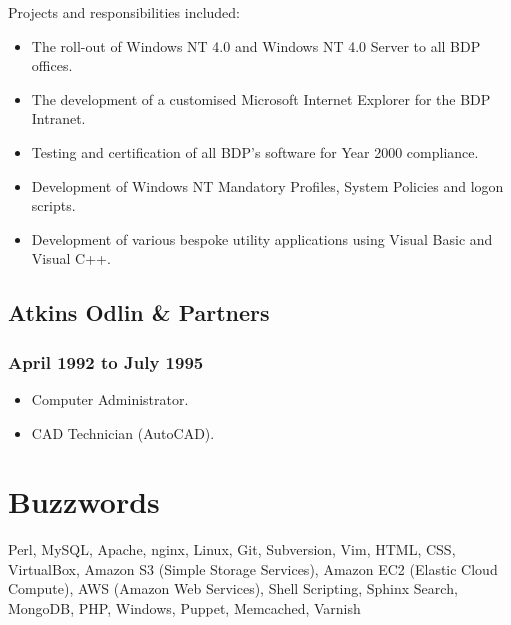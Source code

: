 \documentclass[10pt]{article}
\begin{document}
Projects and responsibilities included:

\begin{itemize}
    \item The roll-out of Windows NT 4.0 and Windows NT 4.0 Server to all BDP offices.
    \item The development of a customised Microsoft Internet Explorer for the BDP
          Intranet.
    \item Testing and certification of all BDP's software for Year 2000 compliance.
    \item Development of Windows NT Mandatory Profiles, System Policies and logon
          scripts.
    \item Development of various bespoke utility applications using Visual Basic and
          Visual C++.
\end{itemize}

\subsection{Atkins Odlin \& Partners}
\subsubsection{April 1992 to July 1995}

\begin{itemize}
    \item Computer Administrator.
    \item CAD Technician (AutoCAD).
\end{itemize}

\section{Buzzwords}

Perl, MySQL, Apache, nginx, Linux, Git, Subversion, Vim, HTML, CSS,
VirtualBox, Amazon S3 (Simple Storage Services), Amazon EC2 (Elastic Cloud
Compute), AWS (Amazon Web Services), Shell Scripting, Sphinx Search, MongoDB,
PHP, Windows, Puppet, Memcached, Varnish
\end{document}
